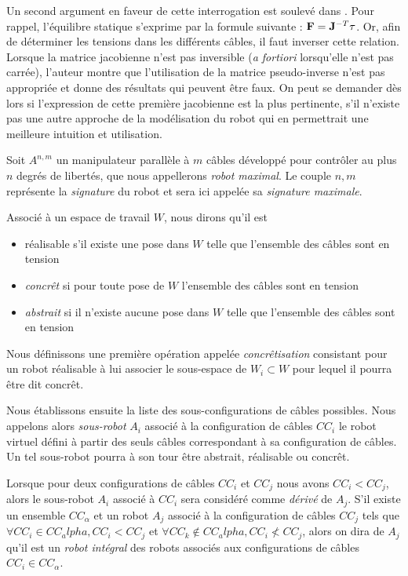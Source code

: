 Un second argument en faveur de cette interrogation est soulevé dans \cite{merlet2012}. Pour rappel, l'équilibre statique s'exprime par la formule suivante : $\mathcal {\bf F} = {\bf J}^{-T} {\bf \tau}$. Or, afin de déterminer les tensions dans les différents câbles, il faut inverser cette relation. Lorsque la matrice jacobienne n'est pas inversible ({\it a fortiori} lorsqu'elle n'est pas carrée), l'auteur montre que l'utilisation de la matrice pseudo-inverse n'est pas appropriée et donne des résultats qui peuvent être faux. On peut se demander dès lors si l'expression de cette première jacobienne est la plus pertinente, s'il n'existe pas une autre approche de la modélisation du robot qui en permettrait une meilleure intuition et utilisation.

Soit $A^{n, m}$ un manipulateur parall\`ele \`a $m$ c\^ables d\'evelopp\'e pour 
contr\^oler au plus $n$ degr\'es de libert\'es, que nous appellerons {\it 
robot maximal}. Le couple ${n, m}$ repr\'esente la {\it signature} du robot et 
sera ici appel\'ee sa {\it signature maximale}.

Associ\'e à un espace de travail $W$, nous dirons qu'il est
\begin{itemize}
 \item {r\'ealisable} s'il existe une pose dans $W$ telle que l'ensemble des 
c\^ables sont en tension
  \item {\it concr\^et} si pour toute pose de $W$ l'ensemble des c\^ables sont 
en tension
  \item {\it abstrait} si il n'existe aucune pose dans $W$ telle que l'ensemble 
des c\^ables sont en tension
\end{itemize}

Nous d\'efinissons une première op\'eration appel\'ee {\it concr\^etisation} 
consistant pour un robot r\'ealisable \`a lui associer le sous-espace de $W_i 
\subset W$ pour lequel il pourra \^etre dit concr\^et. 

Nous \'etablissons ensuite la liste des sous-configurations de c\^ables 
possibles. Nous appelons alors {\it sous-robot} $A_i$ associ\'e \`a la 
configuration de c\^ables $CC_i$ le robot virtuel d\'efini \`a partir des seuls 
c\^ables correspondant \`a sa configuration de c\^ables. Un tel sous-robot 
pourra \`a son tour \^etre abstrait, r\'ealisable ou concr\^et.

Lorsque pour deux configurations de c\^ables $CC_i$ et $CC_j$ nous avons $CC_i< 
CC_j$, alors le sous-robot $A_i$ associ\'e \`a $CC_i$ sera consid\'er\'e comme 
{\it d\'eriv\'e} de $A_j$. S'il existe un ensemble $CC_\alpha$ et un robot 
$A_j$ associ\'e \`a la configuration de c\^ables $CC_j$ tels que $\forall CC_i 
\in CC_alpha, CC_i < CC_j$ et $\forall CC_k \notin CC_alpha, CC_i \nless 
CC_j$, alors on dira de $A_j$ qu'il est un {\it robot int\'egral} des robots 
associ\'es aux configurations de c\^ables $CC_i \in CC_\alpha$.

